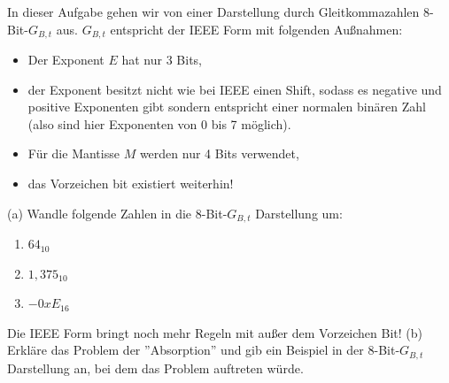 \documentclass{scrartcl}
\begin{document}
	In dieser Aufgabe gehen wir von einer Darstellung durch Gleitkommazahlen 8-Bit-$G_{B,t}$ aus. $G_{B,t}$ entspricht der IEEE Form mit folgenden Außnahmen:
	\begin{itemize}
		\item Der Exponent $E$ hat nur 3 Bits,
		\item der Exponent besitzt nicht wie bei IEEE einen Shift, sodass es negative und positive Exponenten gibt sondern entspricht einer normalen binären Zahl (also sind hier Exponenten von 0 bis 7 möglich).
		\item Für die Mantisse $M$ werden nur 4 Bits verwendet,
		\item das Vorzeichen bit existiert weiterhin!
	\end{itemize}
	(a) 
	Wandle folgende Zahlen in die 8-Bit-$G_{B,t}$ Darstellung um:
	\begin{enumerate}
		\item $64_{10}$
		\item $1,375_{10}$
		\item $- 0xE_{16}$
	\end{enumerate}
	 Die IEEE Form bringt noch mehr Regeln mit außer dem Vorzeichen Bit!
	\lbreak
	(b) 
	Erkläre das Problem der ''Absorption'' und gib ein Beispiel in der 8-Bit-$G_{B,t}$ Darstellung an, bei dem das Problem auftreten würde.
	

\end{document}
